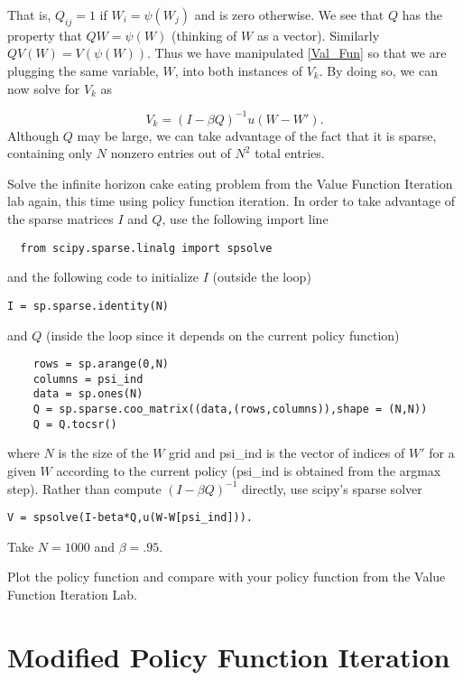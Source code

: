 That is, $Q_{ij} = 1$ if $W_i = \psi(W_j)$ and is zero otherwise.  We see that $Q$ has the property that $QW = \psi(W)$ (thinking of $W$ as a vector).  Similarly $QV(W) = V(\psi(W))$.  Thus we have manipulated \ref{Val_Fun} so that we are plugging the same variable, $W$, into both instances of $V_k$.  By doing so, we can now solve for $V_k$ as

\begin{equation}
V_k = (I-\beta Q)^{-1}u(W-W').
\end{equation}
Although $Q$ may be large, we can take advantage of the fact that it is sparse, containing only $N$ nonzero entries out of $N^2$ total entries.

\begin{problem}
Solve the infinite horizon cake eating problem from the Value Function Iteration lab again, this time using policy function iteration.  In order to take advantage of the sparse matrices $I$ and $Q$, use the following import line

\begin{lstlisting}
  from scipy.sparse.linalg import spsolve
\end{lstlisting}

and the following code to initialize $I$ (outside the loop)
\begin{lstlisting}
I = sp.sparse.identity(N)
\end{lstlisting}
and $Q$ (inside the loop since it depends on the current policy function)
\begin{lstlisting}
    rows = sp.arange(0,N)
    columns = psi_ind
    data = sp.ones(N)
    Q = sp.sparse.coo_matrix((data,(rows,columns)),shape = (N,N))
    Q = Q.tocsr()
\end{lstlisting}
where $N$ is the size of the $W$ grid and psi\_ind is the vector of indices of $W'$ for a given $W$ according to the current policy (psi\_ind is obtained from the argmax step).  Rather than compute $(I-\beta Q)^{-1}$ directly, use scipy's sparse solver

\begin{lstlisting}
V = spsolve(I-beta*Q,u(W-W[psi_ind])).
\end{lstlisting}



Take $N = 1000$ and $\beta = .95$.

Plot the policy function and compare with your policy function from the Value Function Iteration Lab.
\end{problem}

\section*{Modified Policy Function Iteration}

